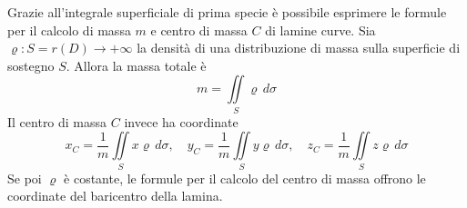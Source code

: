  \begin{oss}
     Grazie all'integrale superficiale di prima specie è possibile esprimere le formule per il calcolo di massa $m$ e centro di massa $C$ di lamine curve. Sia $\varrho: S=r(D) \to +\infty$ la densità di una distribuzione di massa sulla superficie di sostegno $S$. Allora la massa totale è
     \begin{equation*}
         m= \iint\limits_S{\varrho}\, d\sigma
     \end{equation*}
     Il centro di massa $C$ invece ha coordinate
     \begin{equation*}
         x_C= \frac{1}{m}\iint\limits_{S}{x \varrho}\, d\sigma, \quad y_C= \frac{1}{m}\iint\limits_{S}{y \varrho}\, d\sigma, \quad z_C= \frac{1}{m}\iint\limits_{S}{z \varrho}\, d\sigma
     \end{equation*}
     Se poi $\varrho$ è costante, le formule per il calcolo del centro di massa offrono le coordinate del baricentro della lamina. 
 \end{oss}
